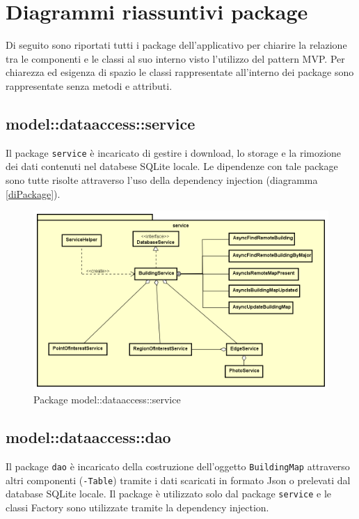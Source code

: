 \documentclass[../DefinizioneDiProdotto.tex,lanscape]{subfiles}
\begin{document}
\section{Diagrammi riassuntivi package}
	Di seguito sono riportati tutti i package dell'applicativo per chiarire la relazione tra le componenti e le classi al suo interno visto l'utilizzo del pattern MVP. Per chiarezza ed esigenza di spazio le classi rappresentate all'interno dei package sono rappresentate senza metodi e attributi.

	

	\subsection{model::dataaccess::service}
		Il package \verb|service| è incaricato di gestire i download, lo storage e la rimozione dei dati contenuti nel databese SQLite locale. Le dipendenze con tale package sono tutte risolte attraverso l'uso della dependency injection (diagramma \ref{diPackage}).

\begin{figure}[h]
	\centering
	\includegraphics[width=\textwidth]{img/RelationPackage/service}
	\caption{Package model::dataaccess::service}
	\label{servicePackage}
\end{figure}


\newpage
	\subsection{model::dataaccess::dao}
		Il package \verb|dao| è incaricato della costruzione dell'oggetto \verb|BuildingMap| attraverso altri componenti (\verb|-Table|) tramite i dati scaricati in formato Json o prelevati dal database SQLite locale. Il package è utilizzato solo dal package \verb|service| e le classi Factory sono utilizzate tramite la dependency injection.
\end{document}
